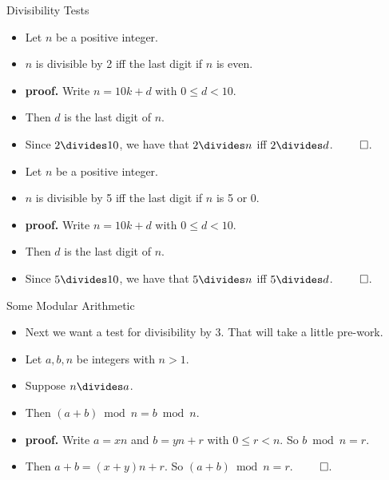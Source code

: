 \documentclass{beamer}
\begin{document}
\begin{frame}{Divisibility Tests}
\begin{itemize}
  \item Let $n$ be a positive integer.
  \item $n$ is divisible by 2 iff the last digit if $n$ is even.
  \item \textbf{proof.} Write $n=10k + d$ with $0\leq d < 10$.
  \item Then $d$ is the last digit of $n$.
  \item Since $2\divides 10$, we have that $2\divides n$ iff $2\divides d$. $\qed$.
  \item Let $n$ be a positive integer.
  \item $n$ is divisible by 5 iff the last digit if $n$ is 5 or 0.
  \item \textbf{proof.} Write $n=10k + d$ with $0\leq d < 10$.
  \item Then $d$ is the last digit of $n$.
  \item Since $5\divides 10$, we have that $5\divides n$ iff $5\divides d$. $\qed$.
\end{itemize}

\end{frame}

\begin{frame}{Some Modular Arithmetic}
\begin{itemize}
  \item Next we want a test for divisibility by 3. That will take a little pre-work.
  \item Let $a,b,n$ be integers with $n>1$.
  \item Suppose $n\divides a$.
  \item Then $(a+b) \bmod n = b \bmod n$.
  \item \textbf{proof.} Write $a=xn$ and $b=yn+r$ with $0\leq r < n$. So $b \bmod n = r$.
  \item Then $a+b = (x+y)n + r$. So $(a+b) \bmod n = r$. $\qed$.
\end{itemize}
\end{frame}
\end{document}
